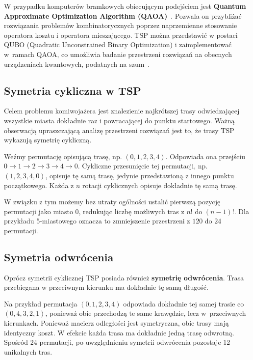 W przypadku komputerów bramkowych obiecującym podejściem jest \textbf{Quantum Approximate Optimization Algorithm (QAOA)}~\cite{farhi2014qaoa}. Pozwala on przybliżać rozwiązania problemów kombinatorycznych poprzez naprzemienne stosowanie operatora kosztu i operatora mieszającego. TSP można przedstawić w postaci QUBO (Quadratic Unconstrained Binary Optimization) i zaimplementować w~ramach QAOA, co umożliwia badanie przestrzeni rozwiązań na obecnych urządzeniach kwantowych, podatnych na szum~\cite{herrman2021quantum}.

\subsection{Symetria cykliczna w TSP}

Celem problemu komiwojażera jest znalezienie najkrótszej trasy odwiedzającej wszystkie miasta dokładnie raz i powracającej do punktu startowego. Ważną obserwacją upraszczającą analizę przestrzeni rozwiązań jest to, że trasy TSP wykazują symetrię cykliczną.

Weźmy permutację opisującą trasę, np. $(0, 1, 2, 3, 4)$. Odpowiada ona przejściu $0 \to 1 \to 2 \to 3 \to 4 \to 0$. Cykliczne przesunięcie tej permutacji, np. $(1, 2, 3, 4, 0)$, opisuje tę samą trasę, jedynie przedstawioną z innego punktu początkowego. Każda z $n$ rotacji cyklicznych opisuje dokładnie tę samą trasę.

W związku z tym możemy bez utraty ogólności ustalić pierwszą pozycję permutacji jako miasto 0, redukując liczbę możliwych tras z $n!$ do $(n-1)!$. Dla przykładu 5-miastowego oznacza to zmniejszenie przestrzeni z $120$ do $24$ permutacji.

\subsection{Symetria odwrócenia}


Oprócz symetrii cyklicznej TSP posiada również \textbf{symetrię odwrócenia}. Trasa przebiegana w przeciwnym kierunku ma dokładnie tę samą długość.

Na przykład permutacja $(0, 1, 2, 3, 4)$ odpowiada dokładnie tej samej trasie co $(0, 4, 3, 2, 1)$, ponieważ obie przechodzą te same krawędzie, lecz w~przeciwnych kierunkach. Ponieważ macierz odległości jest symetryczna, obie trasy mają identyczny koszt.
%
W efekcie każda trasa ma dokładnie jedną trasę odwrotną. Spośród 24 permutacji, po uwzględnieniu symetrii odwrócenia pozostaje 12 unikalnych tras.

